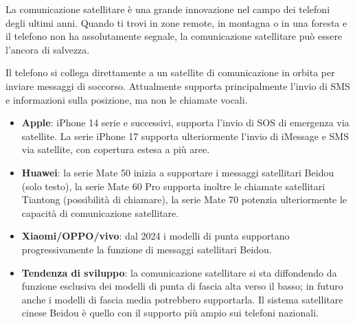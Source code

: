 


La comunicazione satellitare è una grande innovazione nel campo dei telefoni degli ultimi anni. Quando ti trovi in zone remote, in montagna o in una foresta e il telefono non ha assolutamente segnale, la comunicazione satellitare può essere l'ancora di salvezza.


Il telefono si collega direttamente a un satellite di comunicazione in orbita per inviare messaggi di soccorso. Attualmente supporta principalmente l'invio di SMS e informazioni sulla posizione, ma non le chiamate vocali.


\begin{itemize}
  \item \textbf{Apple}: iPhone 14 serie e successivi, supporta l'invio di SOS di emergenza via satellite. La serie iPhone 17 supporta ulteriormente l'invio di iMessage e SMS via satellite, con copertura estesa a più aree.
  \item \textbf{Huawei}: la serie Mate 50 inizia a supportare i messaggi satellitari Beidou (solo testo), la serie Mate 60 Pro supporta inoltre le chiamate satellitari Tiantong (possibilità di chiamare), la serie Mate 70 potenzia ulteriormente le capacità di comunicazione satellitare.
  \item \textbf{Xiaomi/OPPO/vivo}: dal 2024 i modelli di punta supportano progressivamente la funzione di messaggi satellitari Beidou.
  \item \textbf{Tendenza di sviluppo}: la comunicazione satellitare si sta diffondendo da funzione esclusiva dei modelli di punta di fascia alta verso il basso; in futuro anche i modelli di fascia media potrebbero supportarla. Il sistema satellitare cinese Beidou è quello con il supporto più ampio sui telefoni nazionali.
\end{itemize}

